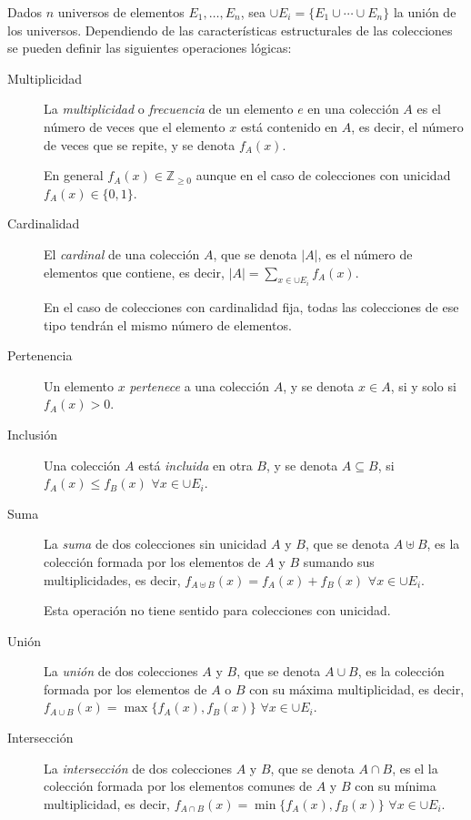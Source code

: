 \documentclass[a4paper,10pt,twoside]{article}
\theoremstyle{definition}
\begin{document}
Dados $n$ universos de elementos $E_1,\ldots, E_n$, sea $\cup E_i=\{E_1\cup \cdots\cup E_n\}$ la unión de los universos.
Dependiendo de las características estructurales de las colecciones se pueden definir las siguientes operaciones lógicas: 

\begin{description}
\item[Multiplicidad] La \emph{multiplicidad} o \emph{frecuencia} de un elemento $e$ en una colección $A$ es el número de veces que el elemento $x$ está contenido en $A$, es decir, el número de veces que se repite, y se denota $f_A(x)$. 

En general $f_A(x)\in \mathbb{Z}_{\geq 0}$ aunque en el caso de colecciones con unicidad $f_A(x)\in \{0,1\}$.

\item[Cardinalidad] El \emph{cardinal} de una colección $A$, que se denota $|A|$, es el número de elementos que contiene, es decir, $|A|=\sum_{x\in\cup E_i}f_A(x)$.

En el caso de colecciones con cardinalidad fija, todas las colecciones de ese tipo tendrán el mismo número de elementos.

\item[Pertenencia] Un elemento $x$ \emph{pertenece} a una colección $A$, y se denota $x\in A$, si y solo si $f_A(x)>0$.

\item[Inclusión] Una colección $A$ está \emph{incluida} en otra $B$, y se denota $A\subseteq B$, si $f_A(x)\leq f_B(x)$ $\forall x\in \cup E_i$.

\item[Suma] La \emph{suma} de dos colecciones sin unicidad $A$ y $B$, que se denota $A\uplus B$, es la colección formada por los elementos de $A$ y $B$ sumando sus multiplicidades, es decir, $f_{A\uplus B}(x)=f_A(x)+f_B(x)$ $\forall x\in \cup E_i$. 

Esta operación no tiene sentido para colecciones con unicidad.

\item[Unión] La \emph{unión} de dos colecciones $A$ y $B$, que se denota $A\cup B$, es la colección formada por los elementos de $A$ o $B$ con su máxima multiplicidad, es decir, $f_{A\cup B}(x)=\max\{f_A(x),f_B(x)\}$ $\forall x\in \cup E_i$.

\item[Intersección] La \emph{intersección} de dos colecciones $A$ y $B$, que se denota $A\cap B$, es el la colección formada por los elementos comunes de $A$ y $B$ con su mínima multiplicidad, es decir, $f_{A\cap
B}(x)=\min\{f_A(x),f_B(x)\}$ $\forall x\in \cup E_i$.


\end{description}
\end{document}
